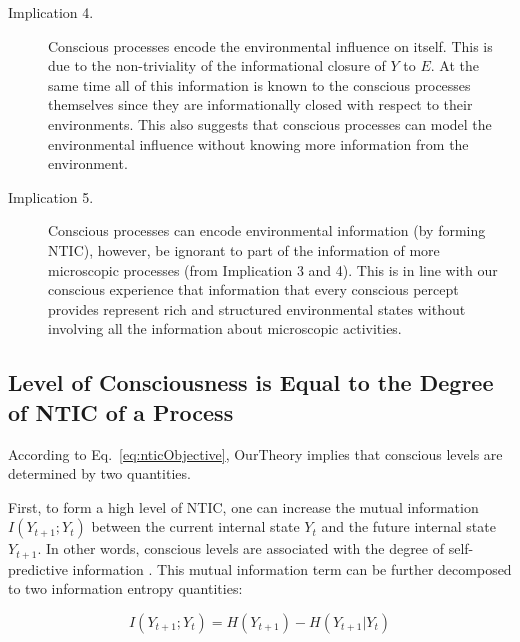 \documentclass[utf8]{article}
\begin{document}
\begin{description}
            
            \item[Implication 4.] 
            Conscious processes encode the environmental influence on itself. This is due to the non-triviality of the informational closure of $Y$ to $E$. At the same time all of this information is known to the conscious processes themselves since they are informationally closed with respect to their environments. This also suggests that conscious processes can model the environmental influence without knowing more information from the environment.
            
            \item[Implication 5.]
            Conscious processes can encode environmental information (by forming NTIC), however, be ignorant to part of the information of more microscopic processes (from Implication 3 and 4). This is in line with our conscious experience that information that every conscious percept provides represent rich and structured environmental states without involving all the information about microscopic activities.
        \end{description}
		
		
	    \subsection{Level of Consciousness is Equal to the Degree of NTIC of a Process}\label{sec:cl}
            According to Eq.~\ref{eq:nticObjective}, \ac{OurTheory} implies that conscious levels are determined by two quantities. 
            
            First, to form a high level of NTIC, one can increase the mutual information $I(Y_{t+1};Y_{t})$ between the current internal state $Y_t$ and the future internal state $Y_{t+1}$. In other words, conscious levels are associated with the degree of self-predictive information \citep{bialek2001predictability}. This mutual information term can be further decomposed to two information entropy quantities: 
            
            \begin{equation}
            \label{eq:SelfEntropy}
            I(Y_{t+1};Y_{t}) = H(Y_{t+1}) - H(Y_{t+1}|Y_t)
            \end{equation}
            
\end{document}

